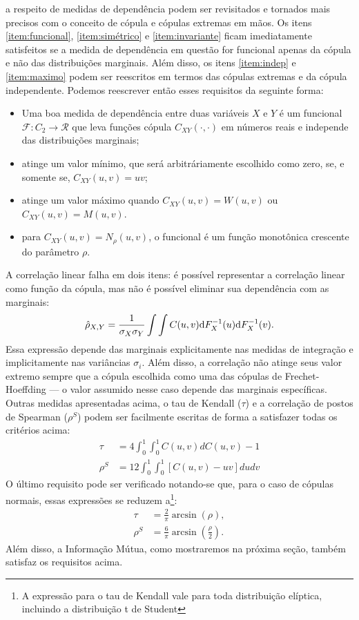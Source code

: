  a respeito de medidas de dependência podem ser revisitados e tornados mais precisos com o conceito de cópula e cópulas extremas em mãos. Os itens \ref{item:funcional}, \ref{item:simétrico} e \ref{item:invariante} ficam imediatamente satisfeitos se a medida de dependência em questão for funcional apenas da cópula e não das distribuições marginais. Além disso, os itens \ref{item:indep} e \ref{item:maximo} podem ser reescritos em termos das cópulas extremas e da cópula independente. Podemos reescrever então esses requisitos da seguinte forma:
\begin{itemize}
\item Uma boa medida de dependência entre duas variáveis $X$ e $Y$ é um funcional $\mathcal{F} : C_{2} \to \mathcal{R}$ que leva funções cópula $C_{XY}(\cdot, \cdot)$ em números reais e independe das distribuições marginais;
\item atinge um valor mínimo, que será arbitráriamente escolhido como zero, se, e somente se, $C_{XY}(u,v) = uv$;
\item atinge um valor máximo quando $C_{XY}(u,v) = W(u,v)$ ou $C_{XY}(u,v) = M(u,v)$.
\item para $C_{XY}(u,v) = N_{\rho}(u,v)$, o funcional é um função monotônica crescente do parâmetro  $\rho$. 
\end{itemize}
A correlação linear falha em dois itens: é possível representar a correlação linear como função da cópula, mas não é possível eliminar sua dependência com as marginais:
\begin{equation*}
 \hat{\rho}_{X,Y} = \frac{1}{\sigma_X\sigma_Y}\int\int C(u,v) \mathrm{d} F_{X}^{-1}(u) \mathrm{d} F_{X}^{-1}(v).
\end{equation*}
Essa expressão depende das marginais explicitamente nas medidas de integração e implicitamente nas variâncias $\sigma_i$. Além disso, a correlação não atinge seus valor extremo sempre que a cópula escolhida como uma das cópulas de Frechet-Hoeffding --- o valor assumido nesse caso depende das marginais específicas. Outras medidas apresentadas acima, o tau de Kendall ($\tau$) e a correlação de postos de Spearman ($\rho^{S}$) podem ser facilmente escritas de forma a satisfazer todas os critérios acima:
\begin{align}
\tau & = 4 \int_0^1\int_0^1 C(u,v) dC(u,v)  - 1  \\
\rho^{S} &=  12 \int_0^1\int_0^1 \left[C(u,v) - uv\right] du dv
\end{align}
O último requisito pode ser verificado notando-se que, para o caso de cópulas normais, essas expressões se reduzem a\footnote{A expressão para o tau de Kendall vale para toda distribuição elíptica, incluindo a distribuição t de Student}:
\begin{align}
\tau &= \frac{2}{\pi} \arcsin(\rho), \\
\rho^{S} &= \frac{6}{\pi} \arcsin\left(\frac{\rho}{2}\right).
\end{align}
Além disso, a Informação Mútua, como mostraremos na próxima seção, também satisfaz os requisitos acima.
